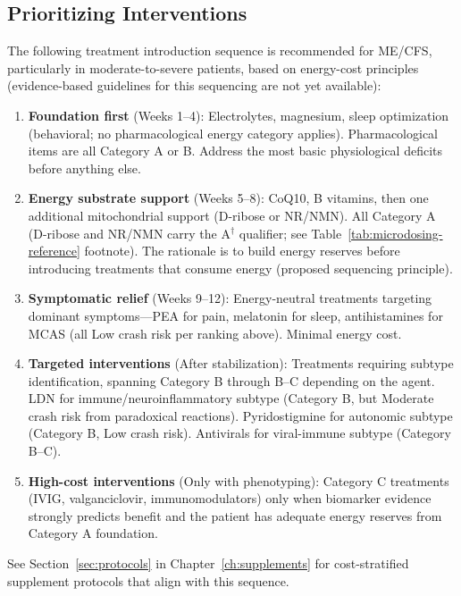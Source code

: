 \subsection{Prioritizing Interventions}
\label{subsec:prioritizing-interventions}

The following treatment introduction sequence is recommended for ME/CFS, particularly in moderate-to-severe patients, based on energy-cost principles (evidence-based guidelines for this sequencing are not yet available):

\begin{enumerate}
    \item \textbf{Foundation first} (Weeks 1--4): Electrolytes, magnesium, sleep optimization (behavioral; no pharmacological energy category applies). Pharmacological items are all Category A or B. Address the most basic physiological deficits before anything else.
    \item \textbf{Energy substrate support} (Weeks 5--8): CoQ10, B vitamins, then one additional mitochondrial support (D-ribose or NR/NMN). All Category A (D-ribose and NR/NMN carry the A$^\dagger$ qualifier; see Table~\ref{tab:microdosing-reference} footnote). The rationale is to build energy reserves before introducing treatments that consume energy (proposed sequencing principle).
    \item \textbf{Symptomatic relief} (Weeks 9--12): Energy-neutral treatments targeting dominant symptoms---PEA for pain, melatonin for sleep, antihistamines for MCAS (all Low crash risk per ranking above). Minimal energy cost.
    \item \textbf{Targeted interventions} (After stabilization): Treatments requiring subtype identification, spanning Category B through B--C depending on the agent. LDN for immune/neuroinflammatory subtype (Category B, but Moderate crash risk from paradoxical reactions). Pyridostigmine for autonomic subtype (Category B, Low crash risk). Antivirals for viral-immune subtype (Category B--C).
    \item \textbf{High-cost interventions} (Only with phenotyping): Category C treatments (IVIG, valganciclovir, immunomodulators) only when biomarker evidence strongly predicts benefit and the patient has adequate energy reserves from Category A foundation.
\end{enumerate}

See Section~\ref{sec:protocols} in Chapter~\ref{ch:supplements} for cost-stratified supplement protocols that align with this sequence.

